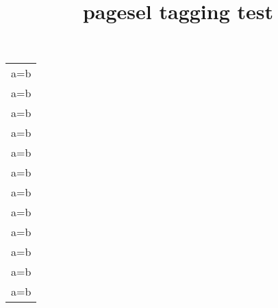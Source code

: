 \documentclass{article}
\title{pagesel tagging test}
\begin{document}
\kant[1-3]
\Blinddocument
\begin{longtable}{c}
a=b \\
a=b \\
a=b \\
a=b \\
a=b \\
a=b \\
a=b \\
a=b \\
a=b \\
a=b \\
a=b \\
a=b \\
\end{longtable}
\end{document}
